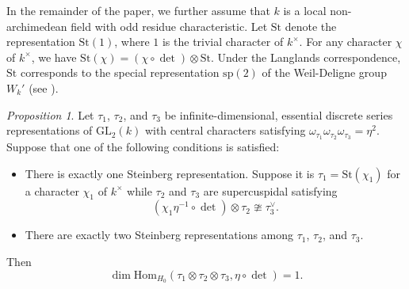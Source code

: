 \documentclass[12pt]{amsart}
\newcommand{\GL}{{\mathrm{GL}}}
\newcommand{\Hom}{{\mathrm{Hom}}}
\theoremstyle{Theorem}
\theoremstyle{Theorem}
\theoremstyle{Theorem}
\theoremstyle{Theorem}
\theoremstyle{Plain}
\theoremstyle{remark}
\theoremstyle{remark}
\theoremstyle{Definition}
\newtheorem{prpd}[dfn]{Proposition}
\begin{document}
In the remainder of the paper, we further assume that $k$ is a local non-archimedean field with odd residue characteristic. Let $\mathrm{St}$ denote the representation $\mathrm{St}(1)$, where $1$ is the trivial character of $k^\times$. For any character $\chi$ of $k^\times$, we have $ \mathrm{St} ( \chi ) = ( \chi \circ \det ) \otimes \mathrm{St} $. Under the Langlands correspondence, $\mathrm{St}$ corresponds to the special representation $\mathrm{sp}(2)$ of the Weil-Deligne group $W_k'$ (see \cite[Theorem 33.3]{B-H}).

\begin{prpd}
    \label{specialcr}
    Let $\tau_1$, $\tau_2$, and $\tau_3$ be infinite-dimensional, essential discrete series representations of $\GL_2(k)$ with central characters satisfying $ \omega_{ \tau_1 } \omega_{ \tau_2 } \omega_{ \tau_3 } = \eta^2 $. Suppose that one of the following conditions is satisfied:
    \begin{itemize}
        \item There is exactly one Steinberg representation. Suppose it is $ \tau_1 = \mathrm{St} \left( \chi_1 \right) $ for a character $\chi_1$ of $k^\times$ while $\tau_2$ and $\tau_3$ are supercuspidal satisfying 
        \[
            \left( \chi_1 \eta^{-1} \circ \det \right) \otimes \tau_2 \ncong \tau_3^\vee.
        \]
        \item There are exactly two Steinberg representations among $\tau_1$, $\tau_2$, and $\tau_3$.
    \end{itemize}
    Then
    \[
        \dim \Hom_{ H_0 } ( \tau_1 \otimes \tau_2 \otimes \tau_3, \eta \circ \det ) = 1.
    \]
\end{prpd}
\end{document}
